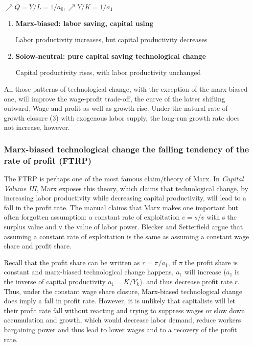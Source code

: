 \documentclass[
  letterpaper,
  DIV=11,
  numbers=noendperiod]{scrreprt}
\begin{document}
\(\nearrow Q = Y/L = 1/a_0, \nearrow Y/K = 1/a_1\)

\begin{enumerate}
\def\labelenumi{\arabic{enumi}.}
\setcounter{enumi}{2}
\item
  \textbf{Marx-biased: labor saving, capital using}

  Labor productivity increases, but capital productivity decreases
\item
  \textbf{Solow-neutral: pure capital saving technological change}

  Capital productivity rises, with labor productivity unchanged
\end{enumerate}

All those patterns of technological change, with the exception of the
marx-biased one, will improve the wage-profit trade-off, the curve of
the latter shifting outward. Wage and profit as well as growth rise.
Under the natural rate of growth closure (3) with exogenous labor
supply, the long-run growth rate does not increase, however.

\hypertarget{marx-biased-technological-change-the-falling-tendency-of-the-rate-of-profit-ftrp}{%
\subsubsection{Marx-biased technological change the falling tendency of
the rate of profit
(FTRP)}\label{marx-biased-technological-change-the-falling-tendency-of-the-rate-of-profit-ftrp}}

The FTRP is perhaps one of the most famous claim/theory of Marx. In
\emph{Capital Volume III}, Marx exposes this theory, which claims that
technological change, by increasing labor productivity while decreasing
capital productivity, will lead to a fall in the profit rate. The manual
claims that Marx makes one important but often forgotten assumption: a
constant rate of exploitation \(e = s/v\) with s the surplus value and v
the value of labor power. Blecker and Setterfield argue that assuming a
constant rate of exploitation is the same as assuming a constant wage
share and profit share.

Recall that the profit share can be written as \(r = \pi / a_1\), if
\(\pi\) the profit share is constant and marx-biased technological
change happens, \(a_1\) will increase (\(a_1\) is the inverse of capital
productivity \(a_1 = K/Y_k\)). and thus decrease profit rate \(r\).
Thus, under the constant wage share closure, Marx-biased technological
change does imply a fall in profit rate. However, it is unlikely that
capitalists will let their profit rate fall without reacting and trying
to suppress wages or slow down accumulation and growth, which would
decrease labor demand, reduce workers bargaining power and thus lead to
lower wages and to a recovery of the profit rate.
\end{document}
